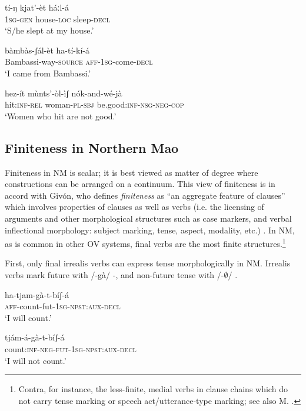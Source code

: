 \documentclass[output=paper]{langsci/langscibook}
\begin{document}
\ea\label{ex:mahland:2}
\gll tí-ŋ           {\downstep}kjat'-èt        háːl-{\downstep}á\\
1\textsc{sg}{}-\textsc{gen}   house-\textsc{loc}   sleep-\textsc{decl} \\
\glt `S/he slept at my house.'
\z

\ea\label{ex:mahland:3}
\gll bàmbàs-ʃál-èt                 ha-tí-kí-{\downstep}á  \\
Bambassi-way-\textsc{source}    \textsc{aff}{}-1\textsc{sg}{}-come-\textsc{decl}\\
\glt `I came from Bambassi.'
\z

\ea\label{ex:mahland:4}
hez-ít           mùnts'-òl-ìʃ      nók-and-wé-jà\\
hit:\textsc{inf-rel}   woman-\textsc{pl-sbj}  be.good:\textsc{inf-nsg-neg-cop}\\
\glt `Women who hit are not good.'
\z

\subsection{Finiteness in Northern Mao}\label{sec:mahland:1.2}

Finiteness in NM is scalar; it is best viewed as matter of degree where constructions can be arranged on a continuum. This view of finiteness is in accord with Givón, who defines \textit{finiteness} as ``an aggregate feature of clauses'' which involves properties of clauses as well as verbs (i.e. the licensing of arguments and other morphological structures such as case markers, and verbal inflectional morphology: subject marking, tense, aspect, modality, etc.) \citep[25]{Givon2001}. In NM, as is common in other OV systems, final verbs are the most finite structures.\footnote{Contra, for instance, the less-finite, medial verbs in clause chains which do not carry tense marking or speech act/utterance-type marking; see also M. \citet[559]{Ahland2012}.} 

First, only final irrealis verbs can express tense morphologically in NM. Irrealis verbs mark future with /-gà/ -, and non-future tense with /-${\emptyset}$/ .

\ea\label{ex:mahland:5}
\gll ha-tjam-gà-t-bíʃ-á\\
\textsc{aff}{}-count-fut-\textsc{1sg-npst:aux-decl} \\
\glt `I will count.' 
\z

\ea\label{ex:mahland:6}
\gll tjám-á-gà-t-bíʃ-á   \\
count:\textsc{inf-neg-fut-1sg-npst:aux-decl} \\
\glt `I will not count.'
\z
\end{document}
